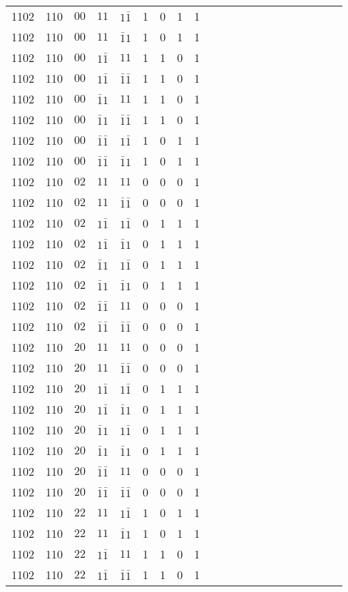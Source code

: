 \begin{longtable*}{c| cccccccccccccccccccc }
1102& 110& $00$& $11$& $1\bar{1}$& 1& 0& 1& 1\\
1102& 110& $00$& $11$& $\bar{1}1$& 1& 0& 1& 1\\
1102& 110& $00$& $1\bar{1}$& $11$& 1& 1& 0& 1\\
1102& 110& $00$& $1\bar{1}$& $\bar{1}\bar{1}$& 1& 1& 0& 1\\
1102& 110& $00$& $\bar{1}1$& $11$& 1& 1& 0& 1\\
1102& 110& $00$& $\bar{1}1$& $\bar{1}\bar{1}$& 1& 1& 0& 1\\
1102& 110& $00$& $\bar{1}\bar{1}$& $1\bar{1}$& 1& 0& 1& 1\\
1102& 110& $00$& $\bar{1}\bar{1}$& $\bar{1}1$& 1& 0& 1& 1\\
1102& 110& $02$& $11$& $11$& 0& 0& 0& 1\\
1102& 110& $02$& $11$& $\bar{1}\bar{1}$& 0& 0& 0& 1\\
1102& 110& $02$& $1\bar{1}$& $1\bar{1}$& 0& 1& 1& 1\\
1102& 110& $02$& $1\bar{1}$& $\bar{1}1$& 0& 1& 1& 1\\
1102& 110& $02$& $\bar{1}1$& $1\bar{1}$& 0& 1& 1& 1\\
1102& 110& $02$& $\bar{1}1$& $\bar{1}1$& 0& 1& 1& 1\\
1102& 110& $02$& $\bar{1}\bar{1}$& $11$& 0& 0& 0& 1\\
1102& 110& $02$& $\bar{1}\bar{1}$& $\bar{1}\bar{1}$& 0& 0& 0& 1\\
1102& 110& $20$& $11$& $11$& 0& 0& 0& 1\\
1102& 110& $20$& $11$& $\bar{1}\bar{1}$& 0& 0& 0& 1\\
1102& 110& $20$& $1\bar{1}$& $1\bar{1}$& 0& 1& 1& 1\\
1102& 110& $20$& $1\bar{1}$& $\bar{1}1$& 0& 1& 1& 1\\
1102& 110& $20$& $\bar{1}1$& $1\bar{1}$& 0& 1& 1& 1\\
1102& 110& $20$& $\bar{1}1$& $\bar{1}1$& 0& 1& 1& 1\\
1102& 110& $20$& $\bar{1}\bar{1}$& $11$& 0& 0& 0& 1\\
1102& 110& $20$& $\bar{1}\bar{1}$& $\bar{1}\bar{1}$& 0& 0& 0& 1\\
1102& 110& $22$& $11$& $1\bar{1}$& 1& 0& 1& 1\\
1102& 110& $22$& $11$& $\bar{1}1$& 1& 0& 1& 1\\
1102& 110& $22$& $1\bar{1}$& $11$& 1& 1& 0& 1\\
1102& 110& $22$& $1\bar{1}$& $\bar{1}\bar{1}$& 1& 1& 0& 1\\

\end{longtable*}
